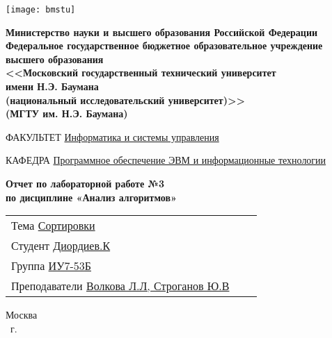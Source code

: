     \thispagestyle{empty}

    \noindent\begin{minipage}{0.05\textwidth}
        \texttt{[image: bmstu]}
    \end{minipage}
    \hfill
    \begin{minipage}{0.85\textwidth}\raggedleft
        \begin{center}
            \fontsize{10pt}{0.3\baselineskip}\selectfont \textbf{Министерство науки и высшего образования Российской Федерации \\ Федеральное государственное бюджетное образовательное учреждение \\ высшего образования \\ <<Московский государственный технический университет \\ имени Н.Э. Баумана \\ (национальный исследовательский университет)>> \\ (МГТУ им. Н.Э. Баумана)}
        \end{center}
    \end{minipage}

    \begin{center}
        \fontsize{12pt}{0.1\baselineskip}\selectfont
        \noindent\makebox[\linewidth]{\rule{\textwidth}{4pt}} \makebox[\linewidth]{\rule{\textwidth}{1pt}}
    \end{center}

    \begin{flushleft}
        \fontsize{12pt}{0.8\baselineskip}\selectfont

        ФАКУЛЬТЕТ \uline{
            \hfill
            Информатика и системы управления
            \hfill}

        КАФЕДРА \uline{\mbox{\hspace{4mm}}
            \hfill
            Программное обеспечение ЭВМ и информационные технологии
            \hfill}
    \end{flushleft}

    \vfill
    
    \begin{center}
        \fontsize{19pt}{\baselineskip}\selectfont

        \textbf{Отчет по лабораторной работе №3} \\
        \textbf{по дисциплине «Анализ алгоритмов»}
    \end{center}

    \vfill
    
    \begin{tabularx}{\textwidth}{Xcc}
        Тема \uline{Сортировки} \\
        Студент \uline{Диордиев.К} \\
        Группа \uline{ИУ7-53Б} \\
        Преподаватели \uline{Волкова Л.Л, Строганов Ю.В} \\
    \end{tabularx}
    
    \vfill
    
    \begin{center}
        \normalsize Москва \\
        \the\year ~г.
    \end{center}

